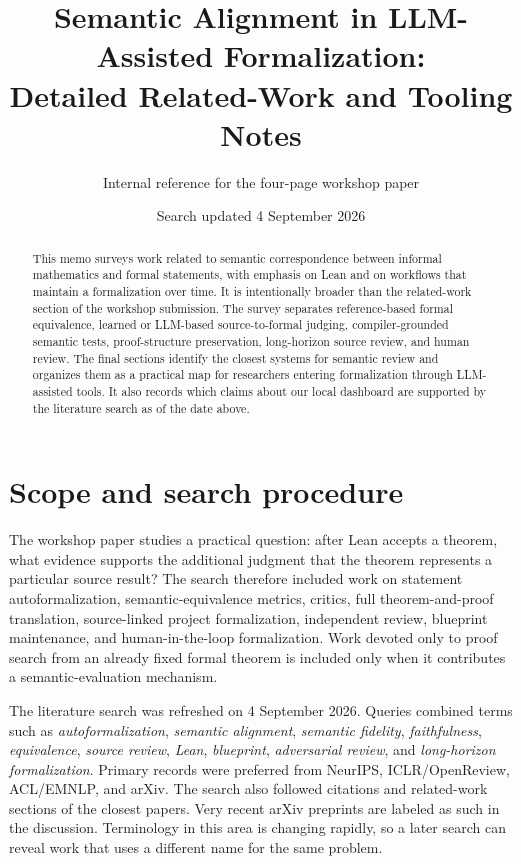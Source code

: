 \documentclass[11pt]{article}
\title{Semantic Alignment in LLM-Assisted Formalization:\\Detailed Related-Work and Tooling Notes}
\author{Internal reference for the four-page workshop paper}
\date{Search updated 4 September 2026}
\begin{document}
\maketitle

\begin{abstract}
This memo surveys work related to semantic correspondence between informal
mathematics and formal statements, with emphasis on Lean and on workflows that
maintain a formalization over time.  It is intentionally broader than the
related-work section of the workshop submission.  The survey separates
reference-based formal equivalence, learned or LLM-based source-to-formal
judging, compiler-grounded semantic tests, proof-structure preservation,
long-horizon source review, and human review.  The final sections identify the
closest systems for semantic review and organizes them as a practical map for
researchers entering formalization through LLM-assisted tools.  It also records
which claims about our local dashboard are supported by the literature search as
of the date above.
\end{abstract}

\tableofcontents

\section{Scope and search procedure}

The workshop paper studies a practical question: after Lean accepts a theorem,
what evidence supports the additional judgment that the theorem represents a
particular source result?  The search therefore included work on statement
autoformalization, semantic-equivalence metrics, critics, full theorem-and-proof
translation, source-linked project formalization, independent review, blueprint
maintenance, and human-in-the-loop formalization.  Work devoted only to proof
search from an already fixed formal theorem is included only when it contributes
a semantic-evaluation mechanism.

The literature search was refreshed on 4 September 2026.  Queries combined
terms such as \emph{autoformalization}, \emph{semantic alignment},
\emph{semantic fidelity}, \emph{faithfulness}, \emph{equivalence},
\emph{source review}, \emph{Lean}, \emph{blueprint}, \emph{adversarial review},
and \emph{long-horizon formalization}.  Primary records were preferred from
NeurIPS, ICLR/OpenReview, ACL/EMNLP, and arXiv.  The search also followed
citations and related-work sections of the closest papers.  Very recent arXiv
preprints are labeled as such in the discussion.  Terminology in this area is
changing rapidly, so a later search can reveal work that uses a different name
for the same problem.
\end{document}
